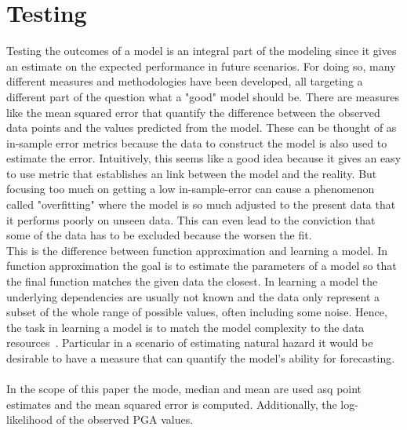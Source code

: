 
\chapter{Testing} %

\label{Chapter3} %


Testing the outcomes of a model is an integral part of the modeling since it gives an estimate on the expected performance in future scenarios. For doing so, many different measures and methodologies have been developed, all targeting a different part of the question what a "good" model should be. There are measures like the mean squared error that quantify the difference between the observed data points and the values predicted from the model. These can be thought of as in-sample error metrics because the data to construct the model is also used to estimate the error. Intuitively, this seems like a good idea because it gives an easy to use metric that establishes an link between the model and the reality. But focusing too much on getting a low in-sample-error can cause a phenomenon called "overfitting" where the model is so much adjusted to the present data that it performs poorly on unseen data. This can even lead to the conviction that some of the data has to be excluded because the worsen the fit.\\
This is the difference between function approximation and learning a model. In function approximation the goal is to estimate the parameters of a model so that the final function matches the given data the closest. In learning a model the underlying dependencies are usually not known and the data only represent a subset of the whole range of possible values, often including some noise. Hence, the task in learning a model is to match the model complexity to the data resources~\citep{LearningFromData}. Particular in a scenario of estimating natural hazard it would be desirable to have a measure that can quantify the model's ability for forecasting.\\\\
In the scope of this paper the mode, median and mean are used asq point estimates and the mean squared error is computed. Additionally, the log-likelihood of the observed PGA values.


